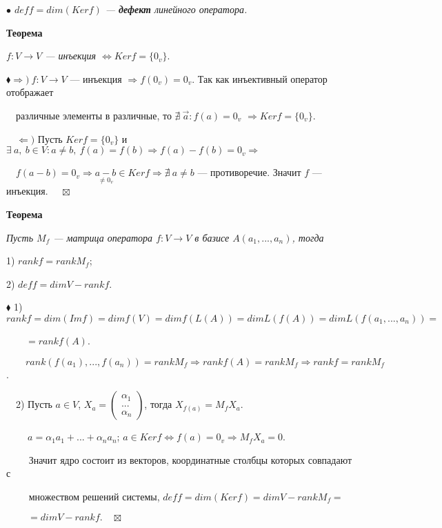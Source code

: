 \documentclass[a4paper, 12pt]{report}
\begin{document}
	\textit{$\bullet$ $def f = dim (Ker f)$ --- \textbf{дефект} линейного оператора.}
	\par\bigskip
	\textbf{Теорема}
	\par
	\textit{$f:V\rightarrow V$ --- инъекция $\Longleftrightarrow Kerf = \{0_v\}$}.
	\par\bigskip
	$\blacklozenge \Rightarrow)\ f:V\rightarrow V$ --- инъекция $\Rightarrow f(0_v) = 0_v$. Так как инъективный оператор отображает 
	
	$\quad$различные элементы в различные, то $\nexists\ \vec{a} : f(a) = 0_v$ $\Rightarrow Kerf = \{ 0_v \}$.
	
	$\quad \Leftarrow )$ Пусть $Kerf = \{ 0_v \}$ и $\exists\ a,\ b\in V : a\ne b,\ f(a) = f(b) \Rightarrow f(a) - f(b) = 0_v \Rightarrow$
	
	$\quad f(a-b) = 0_v \Rightarrow \underset{\ne 0_v}{a-b} \in Kerf \Rightarrow\nexists\ a \ne b$ --- противоречие. Значит $f$ --- инъекция. $\quad\boxtimes$
	\par\bigskip
	\textbf{Теорема}
	
	\textit{Пусть $M_f$ --- матрица оператора $f:V\rightarrow V$ в базисе $A(a_1,...,a_n)$, тогда }
	
	1) $rank f = rank M_f$; 
	
	2) $deff = dim V - rank f$.
	\par\bigskip
	$\blacklozenge$ 1) $rank f= dim(Imf)=dimf(V) = dimf(L(A)) = dim L(f(A)) = dimL(f(a_1,...,a_n)) =$ 
	
	$\qquad = rank f(A)$.
	
	$\qquad rank(f(a_1),...,f(a_n))=rank M_f \Rightarrow rank f(A)= rank M_f \Rightarrow rankf = rank M_f$.
	
	$\quad$2) Пусть $a \in V$, $X_a = \begin{pmatrix} \alpha_1 \\ ... \\ \alpha_n \end{pmatrix}$, тогда $X_{f(a)} = M_f X_a$. 
	
	$\qquad\ a=\alpha_1 a_1 + ... + \alpha_n a_n$; $a\in Kerf \Longleftrightarrow f(a) = 0_v \Rightarrow M_f X_a = 0$.
	
	$\qquad$ Значит ядро состоит из векторов, координатные столбцы которых совпадают с 
	
	$\qquad$ множеством решений системы, $def f = dim(Ker f) = dimV-rankM_f = $
	
	$\qquad\ = dimV - rankf.\quad\boxtimes$
	
	
	
\end{document}
